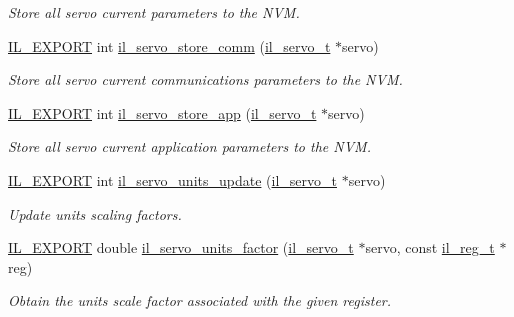 \begin{DoxyCompactItemize}
\begin{DoxyCompactList}\small\item\em Store all servo current parameters to the N\+VM. \end{DoxyCompactList}\item 
\hyperlink{common_8h_a6bb629d26c52bfe10519ba3176853f47}{I\+L\+\_\+\+E\+X\+P\+O\+RT} int \hyperlink{group__IL__SERVO_ga665618a8278570eb3e1f35eecaa38048}{il\+\_\+servo\+\_\+store\+\_\+comm} (\hyperlink{group__IL__SERVO_ga3369ddfcc33492fe3a28f96cf455b13e}{il\+\_\+servo\+\_\+t} $\ast$servo)
\begin{DoxyCompactList}\small\item\em Store all servo current communications parameters to the N\+VM. \end{DoxyCompactList}\item 
\hyperlink{common_8h_a6bb629d26c52bfe10519ba3176853f47}{I\+L\+\_\+\+E\+X\+P\+O\+RT} int \hyperlink{group__IL__SERVO_gaaf4d6d6a1d9f90feaf7783a4a8bb5042}{il\+\_\+servo\+\_\+store\+\_\+app} (\hyperlink{group__IL__SERVO_ga3369ddfcc33492fe3a28f96cf455b13e}{il\+\_\+servo\+\_\+t} $\ast$servo)
\begin{DoxyCompactList}\small\item\em Store all servo current application parameters to the N\+VM. \end{DoxyCompactList}\item 
\hyperlink{common_8h_a6bb629d26c52bfe10519ba3176853f47}{I\+L\+\_\+\+E\+X\+P\+O\+RT} int \hyperlink{group__IL__SERVO_ga8bdb970bbe4c05d2b3f1d78268789bb3}{il\+\_\+servo\+\_\+units\+\_\+update} (\hyperlink{group__IL__SERVO_ga3369ddfcc33492fe3a28f96cf455b13e}{il\+\_\+servo\+\_\+t} $\ast$servo)
\begin{DoxyCompactList}\small\item\em Update units scaling factors. \end{DoxyCompactList}\item 
\hyperlink{common_8h_a6bb629d26c52bfe10519ba3176853f47}{I\+L\+\_\+\+E\+X\+P\+O\+RT} double \hyperlink{group__IL__SERVO_gacde3271e378552034d8c0966ead4f941}{il\+\_\+servo\+\_\+units\+\_\+factor} (\hyperlink{group__IL__SERVO_ga3369ddfcc33492fe3a28f96cf455b13e}{il\+\_\+servo\+\_\+t} $\ast$servo, const \hyperlink{structil__reg__t}{il\+\_\+reg\+\_\+t} $\ast$reg)
\begin{DoxyCompactList}\small\item\em Obtain the units scale factor associated with the given register. \end{DoxyCompactList}\item 

\end{DoxyCompactItemize}
